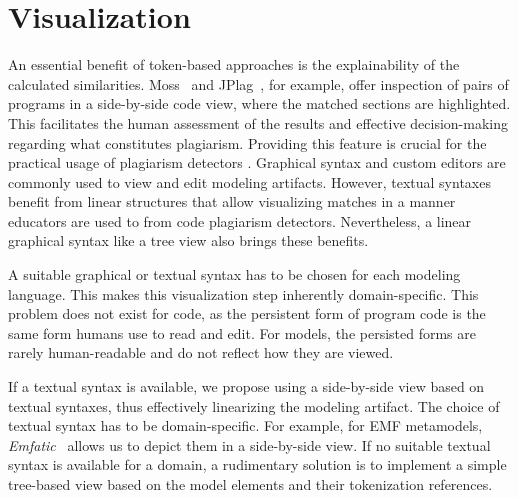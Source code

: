 
\section{Visualization}\label{subsec:visualization}


\noindent
An essential benefit of token-based approaches is the explainability of the calculated similarities. Moss~\cite{MOSS} and JPlag~\cite{prechelt2000}, for example, offer inspection of pairs of programs in a side-by-side code view, where the matched sections are highlighted. This facilitates the human assessment of the results and effective decision-making regarding what constitutes plagiarism. Providing this feature is crucial for the practical usage of plagiarism detectors \cite{Le2013}.
%
Graphical syntax and custom editors are commonly used to view and edit modeling artifacts. However, textual syntaxes benefit from linear structures that allow visualizing matches in a manner educators are used to from code plagiarism detectors. Nevertheless, a linear graphical syntax like a tree view also brings these benefits.

A suitable graphical or textual syntax has to be chosen for each modeling language. This makes this visualization step inherently domain-specific. This problem does not exist for code, as the persistent form of program code is the same form humans use to read and edit. For models, the persisted forms are rarely human-readable and do not reflect how they are viewed.

If a textual syntax is available, we propose using a side-by-side view based on textual syntaxes, thus effectively linearizing the modeling artifact.
The choice of textual syntax has to be domain-specific. For example, for \ac{EMF} metamodels, \textit{Emfatic}~\cite{Emfatic} allows us to depict them in a side-by-side view.
If no suitable textual syntax is available for a domain, a rudimentary solution is to implement a simple tree-based view based on the model elements and their tokenization references.

